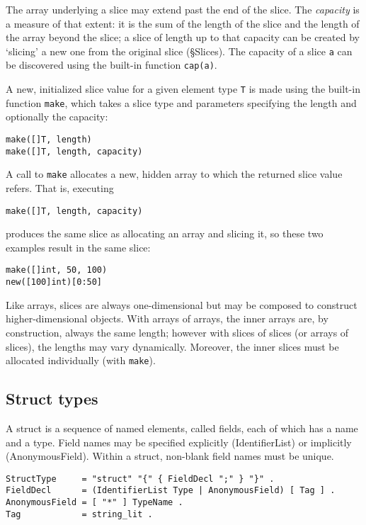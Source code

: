 {The array underlying a slice may extend past the end of the slice. The
\emph{capacity} is a measure of that extent: it is the sum of the length
of the slice and the length of the array beyond the slice; a slice of
length up to that capacity can be created by `slicing' a new one from
the original slice (§Slices). The capacity of a slice
\texttt{a} can be discovered using the built-in function
\texttt{cap(a)}.

A new, initialized slice value for a given element type \texttt{T} is
made using the built-in function
\texttt{make}, which
takes a slice type and parameters specifying the length and optionally
the capacity:

\begin{Verbatim}[frame=single]
make([]T, length)
make([]T, length, capacity)
\end{Verbatim}

A call to \texttt{make} allocates a new, hidden array to which the
returned slice value refers. That is, executing

\begin{Verbatim}[frame=single]
make([]T, length, capacity)
\end{Verbatim}

produces the same slice as allocating an array and slicing it, so these
two examples result in the same slice:

\begin{Verbatim}[frame=single]
make([]int, 50, 100)
new([100]int)[0:50]
\end{Verbatim}

Like arrays, slices are always one-dimensional but may be composed to
construct higher-dimensional objects. With arrays of arrays, the inner
arrays are, by construction, always the same length; however with slices
of slices (or arrays of slices), the lengths may vary dynamically.
Moreover, the inner slices must be allocated individually (with
\texttt{make}).

\subsection*{Struct types}

A struct is a sequence of named elements, called fields, each of which
has a name and a type. Field names may be specified explicitly
(IdentifierList) or implicitly (AnonymousField). Within a struct,
non-blank field names must be
unique.

\begin{Verbatim}[frame=single]
StructType     = "struct" "{" { FieldDecl ";" } "}" .
FieldDecl      = (IdentifierList Type | AnonymousField) [ Tag ] .
AnonymousField = [ "*" ] TypeName .
Tag            = string_lit .
\end{Verbatim}

}
